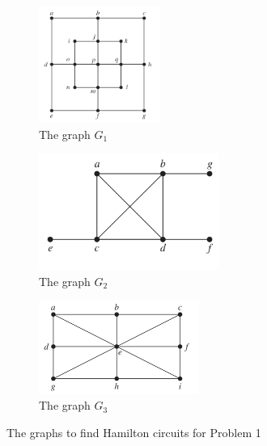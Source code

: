 \documentclass[a4 paper]{article}
\numberwithin{equation}{section}
\newcommand{\0}{\mathbf{0}}
\begin{document}
\begin{figure}[h]
	\centering
	\begin{subfigure}[h]{0.5\textwidth}
		\centering
		\includegraphics[height=1.5in]{circuit-a.png}
		\caption{The graph $G_1$}
		\label{fig:G1a}
	\end{subfigure}%
	\begin{subfigure}[h]{0.5\textwidth}
		\centering
		\includegraphics[height=1.5in]{circuit-b.png}
		\caption{The graph $G_2$}
		\label{fig:G1b}
	\end{subfigure}
	\begin{subfigure}[h]{0.5\textwidth}
		\centering
		\includegraphics[height=1.2in]{circuit-c.png}
		\caption{The graph $G_3$}
		\label{fig:G1c}
	\end{subfigure}
	\caption{The graphs to find Hamilton circuits for Problem 1}
\end{figure}
\end{document}
